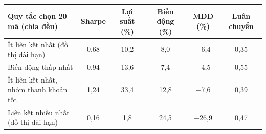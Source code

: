\begin{tabular}{@{}lccccc@{}}
\toprule
Quy tắc chọn 20 mã (chia đều) & Sharpe & Lợi suất (\%) & Biến động (\%) & MDD (\%) & Luân chuyển \\
\midrule
Ít liên kết nhất (đồ thị dài hạn) & 0{,}68 & 10{,}2 & 8{,}0 & $-$6{,}4 & 0{,}35 \\
Biến động thấp nhất & 0{,}94 & 13{,}6 & 7{,}4 & $-$4{,}5 & 0{,}55 \\
Ít liên kết nhất, nhóm thanh khoản tốt & 1{,}24 & 33{,}4 & 12{,}8 & $-$7{,}6 & 0{,}39 \\
Liên kết nhiều nhất (đồ thị dài hạn) & 0{,}16 & 1{,}8 & 24{,}5 & $-$26{,}9 & 0{,}47 \\
\bottomrule
\end{tabular}
